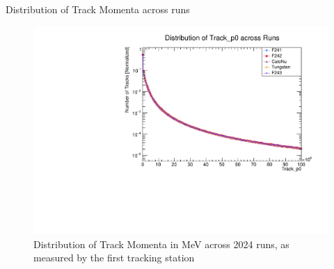 \begin{frame}{Distribution of Track Momenta across runs}
	\begin{figure}
		\includegraphics[width=\linewidth]{./RunwisePlots/Track_p0_runwise.pdf}
		\caption{Distribution of Track Momenta in MeV across 2024 runs, as measured by the first tracking station}
	\end{figure}
\end{frame}

